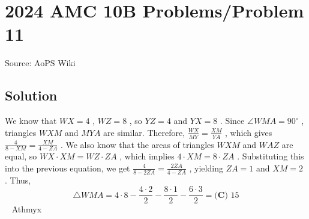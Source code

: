 \documentclass[12pt]{article}
\begin{document}
\section*{{2024 AMC 10B Problems/Problem 11}}
Source: AoPS Wiki

\subsection*{Solution}
We know that $WX = 4$ , $WZ = 8$ , so $YZ = 4$ and $YX = 8$ . Since $\angle WMA = 90^\circ$ , triangles $WXM$ and $MYA$ are similar. Therefore, $\frac{WX}{MY} = \frac{XM}{YA}$ , which gives $\frac{4}{8 - XM} = \frac{XM}{4 - ZA}$ . We also know that the areas of triangles $WXM$ and $WAZ$ are equal, so $WX \cdot XM = WZ \cdot ZA$ , which implies $4 \cdot XM = 8 \cdot ZA$ . Substituting this into the previous equation, we get $\frac{4}{8 - 2ZA} = \frac{2ZA}{4 - ZA}$ , yielding $ZA = 1$ and $XM = 2$ . Thus, \[\triangle WMA = 4 \cdot 8 - \frac{4 \cdot 2}{2} - \frac{8 \cdot 1}{2} - \frac{6 \cdot 3}{2} = \boxed{\textbf{(C) }15}\] ~ Athmyx
\end{document}
